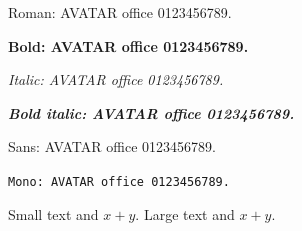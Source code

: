 \documentclass[12pt,letterpaper]{article}
\begin{document}
Roman: AVATAR office 0123456789.

\textbf{Bold: AVATAR office 0123456789.}

\textit{Italic: AVATAR office 0123456789.}

\textbf{\textit{Bold italic: AVATAR office 0123456789.}}

\textsf{Sans: AVATAR office 0123456789.}

\texttt{Mono: AVATAR office 0123456789.}

{\small Small text and $x+y$.} {\Large Large text and $x+y$.}
\end{document}
